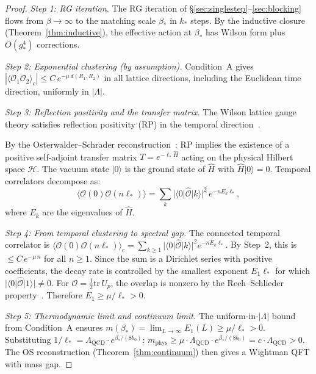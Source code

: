 \documentclass[11pt]{article}
\theoremstyle{definition}
\newcommand{\tr}{\mathrm{tr}}
\newcommand{\Lam}{\Lambda_{\mathrm{QCD}}}
\begin{document}
\begin{proof}
\emph{Step 1: RG iteration.}
The RG iteration of \S\ref{sec:singlestep}--\ref{sec:blocking}
flows from $\beta\to\infty$ to the matching scale $\beta_*$ in $k_*$
steps.  By the inductive closure (Theorem~\ref{thm:inductive}),
the effective action at $\beta_*$ has Wilson form plus
$O(g_*^4)$ corrections.

\emph{Step 2: Exponential clustering (by assumption).}
Condition~A gives
$|\langle\mathcal{O}_1\mathcal{O}_2\rangle_c|
\le C\,e^{-\mu\,d(R_1,R_2)}$
in all lattice directions, including the Euclidean time direction,
uniformly in $|\Lambda|$.

\emph{Step 3: Reflection positivity and the transfer matrix.}
The Wilson lattice gauge theory satisfies
reflection positivity (RP) in the temporal
direction~\cite{FroehlichSimon,OS78}.

By the Osterwalder--Schrader
reconstruction~\cite{OS73,GJ,Seiler82}: RP implies the
existence of a positive self-adjoint transfer matrix
$T=e^{-\ell_*\hat{H}}$ acting on the physical Hilbert space
$\mathcal{H}$.
The vacuum state $|0\rangle$ is the ground state of $\hat{H}$
with $\hat{H}|0\rangle=0$.  Temporal correlators decompose as:
\begin{equation}\label{eq:spectral-decomp}
\langle\mathcal{O}(0)\mathcal{O}(n\ell_*)\rangle
=\sum_k|\langle 0|\hat{\mathcal{O}}|k\rangle|^2\,
e^{-nE_k\ell_*},
\end{equation}
where $E_k$ are the eigenvalues of $\hat{H}$.

\emph{Step 4: From temporal clustering to spectral gap.}
The connected temporal correlator is
$\langle\mathcal{O}(0)\mathcal{O}(n\ell_*)\rangle_c
=\sum_{k\ge 1}|\langle 0|\hat{\mathcal{O}}|k\rangle|^2
e^{-nE_k\ell_*}$.
By Step~2, this is $\le C\,e^{-\mu\,n}$ for all $n\ge 1$.
Since the sum is a Dirichlet series with positive coefficients,
the decay rate is controlled by the smallest exponent
$E_1\ell_*$ for which $|\langle 0|\hat{\mathcal{O}}|1\rangle|
\ne 0$.  For $\mathcal{O}=\frac{1}{2}\tr\,U_p$, the overlap
is nonzero by the Reeh--Schlieder
property~\cite{Seiler82,FroehlichSimon}.  Therefore
$E_1\ge\mu/\ell_*>0$.

\emph{Step 5: Thermodynamic limit and continuum limit.}
The uniform-in-$|\Lambda|$ bound from Condition~A ensures
$m(\beta_*)=\lim_{L\to\infty}E_1(L)\ge\mu/\ell_*>0$.
Substituting $1/\ell_*=\Lam\cdot e^{\beta_*/(8b_0)}$:
$m_{\mathrm{phys}}\ge\mu\cdot\Lam\cdot e^{\beta_*/(8b_0)}
=c\cdot\Lam>0$.
The OS reconstruction (Theorem~\ref{thm:continuum}) then gives
a Wightman QFT with mass gap.
\end{proof}
\end{document}

